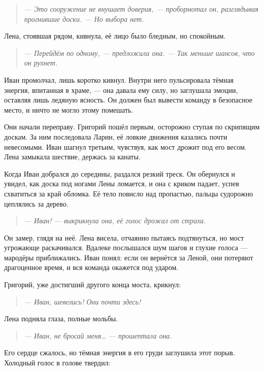 \documentclass[12pt,a4paper]{book}
\newenvironment{dialogue}{\begin{quote}\itshape}{\end{quote}} %
\begin{document}
\begin{dialogue}
--- Это сооружение не внушает доверия, --- пробормотал он, разглядывая прогнившие доски. --- Но выбора нет.
\end{dialogue}

Лена, стоявшая рядом, кивнула, её лицо было бледным, но спокойным.

\begin{dialogue}
--- Перейдём по одному, --- предложила она. --- Так меньше шансов, что он рухнет.
\end{dialogue}

Иван промолчал, лишь коротко кивнул. Внутри него пульсировала тёмная энергия, впитанная в храме, --- она давала ему силу, но заглушала эмоции, оставляя лишь ледяную ясность. Он должен был вывести команду в безопасное место, и ничто не могло этому помешать.

Они начали переправу. Григорий пошёл первым, осторожно ступая по скрипящим доскам. За ним последовала Ларин, её ловкие движения казались почти невесомыми. Иван шагнул третьим, чувствуя, как мост дрожит под его весом. Лена замыкала шествие, держась за канаты.

Когда Иван добрался до середины, раздался резкий треск. Он обернулся и увидел, как доска под ногами Лены ломается, и она с криком падает, успев схватиться за край обломка. Её тело повисло над пропастью, пальцы судорожно цеплялись за дерево.

\begin{dialogue}
--- Иван! --- выкрикнула она, её голос дрожал от страха.
\end{dialogue}

Он замер, глядя на неё. Лена висела, отчаянно пытаясь подтянуться, но мост угрожающе раскачивался. Вдалеке послышался шум шагов и глухие голоса --- мародёры приближались. Иван понял: если он вернётся за Леной, они потеряют драгоценное время, и вся команда окажется под ударом.

Григорий, уже достигший другого конца моста, крикнул:

\begin{dialogue}
--- Иван, шевелись! Они почти здесь!
\end{dialogue}

Лена подняла глаза, полные мольбы.

\begin{dialogue}
--- Иван, не бросай меня… --- прошептала она.
\end{dialogue}

Его сердце сжалось, но тёмная энергия в его груди заглушила этот порыв. Холодный голос в голове твердил:
\end{document}

